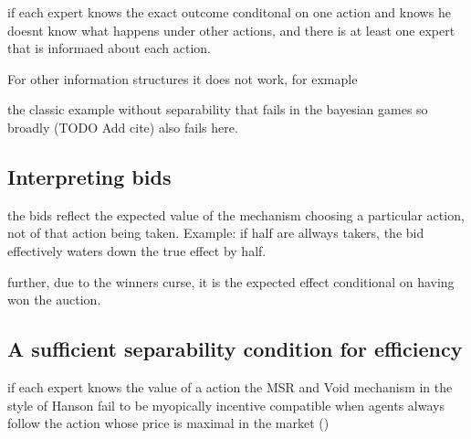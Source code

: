 \begin{lem}
	if each expert knows the exact outcome conditonal on one action and knows he doesnt know what happens under other actions, and there is at least one expert that is informaed about each action.
\end{lem}

For other information structures it does not work, for exmaple 
\begin{eg}
	the classic example without separability that fails in the bayesian games so broadly (TODO Add cite) also fails here. 
\end{eg}


\subsection{Interpreting bids}

the bids reflect the expected value of the mechanism choosing a particular action, not of that action being taken.  Example: if half are allways takers, the bid effectively waters down the true effect by half.

further, due to the winners curse, it is the expected effect conditional on having won the auction. 


\subsection{A sufficient separability condition for efficiency}

if each expert knows the value of a action the MSR and Void mechanism in the style of Hanson fail to be myopically incentive compatible when agents always follow the action whose price is maximal in the market (\cite{othman2010decision})



